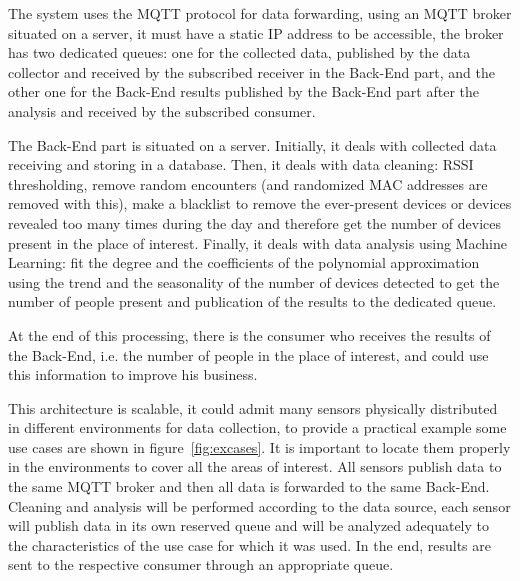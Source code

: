 The system uses the MQTT protocol for data forwarding, using an MQTT broker situated on a server, it must have a static IP address to be accessible, the broker has two dedicated queues: one for the collected data, published by the data collector and received by the subscribed receiver in the Back-End part, and the other one for the Back-End results published by the Back-End part after the analysis and received by the subscribed consumer.

The Back-End part is situated on a server. Initially, it deals with collected data receiving and storing in a database. Then, it deals with data cleaning: RSSI thresholding, remove random encounters (and randomized MAC addresses are removed with this), make a blacklist to remove the ever-present devices or devices revealed too many times during the day and therefore get the number of devices present in the place of interest. Finally, it deals with data analysis using Machine Learning: fit the degree and the coefficients of the polynomial approximation using the trend and the seasonality of the number of devices detected to get the number of people present and publication of the results to the dedicated queue.

At the end of this processing, there is the consumer who receives the results of the Back-End, i.e. the number of people in the place of interest, and could use this information to improve his business.

This architecture is scalable, it could admit many sensors physically distributed in different environments for data collection, to provide a practical example some use cases are shown in figure~\ref{fig:excases}. It is important to locate them properly in the environments to cover all the areas of interest. All sensors publish data to the same MQTT broker and then all data is forwarded to the same Back-End. Cleaning and analysis will be performed according to the data source, each sensor will publish data in its own reserved queue and will be analyzed adequately to the characteristics of the use case for which it was used. In the end, results are sent to the respective consumer through an appropriate queue.

